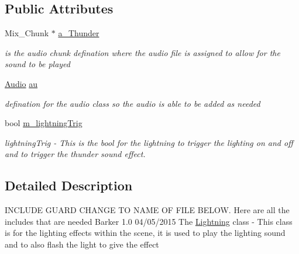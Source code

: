 \subsection*{Public Attributes}
\begin{DoxyCompactItemize}
\item 
\hypertarget{classLightning_ae790ebe9738a86bb5bf07ff7107a0eab}{
Mix\_\-Chunk $\ast$ \hyperlink{classLightning_ae790ebe9738a86bb5bf07ff7107a0eab}{a\_\-Thunder}}
\label{classLightning_ae790ebe9738a86bb5bf07ff7107a0eab}

\begin{DoxyCompactList}\small\item\em is the audio chunk defination where the audio file is assigned to allow for the sound to be played \item\end{DoxyCompactList}\item 
\hypertarget{classLightning_a9c9de1029145dfe8c9028ae8e5a7fe26}{
\hyperlink{classAudio}{Audio} \hyperlink{classLightning_a9c9de1029145dfe8c9028ae8e5a7fe26}{au}}
\label{classLightning_a9c9de1029145dfe8c9028ae8e5a7fe26}

\begin{DoxyCompactList}\small\item\em defination for the audio class so the audio is able to be added as needed \item\end{DoxyCompactList}\item 
\hypertarget{classLightning_aad17ebd1b8b3588bd26c22d5e7ad08c6}{
bool \hyperlink{classLightning_aad17ebd1b8b3588bd26c22d5e7ad08c6}{m\_\-lightningTrig}}
\label{classLightning_aad17ebd1b8b3588bd26c22d5e7ad08c6}

\begin{DoxyCompactList}\small\item\em lightningTrig -\/ This is the bool for the lightning to trigger the lighting on and off and to trigger the thunder sound effect. \item\end{DoxyCompactList}\end{DoxyCompactItemize}


\subsection{Detailed Description}
INCLUDE GUARD CHANGE TO NAME OF FILE BELOW. Here are all the includes that are needed  Barker  1.0 04/05/2015 The \hyperlink{classLightning}{Lightning} class -\/ This class is for the lighting effects within the scene, it is used to play the lighting sound and to also flash the light to give the effect 

